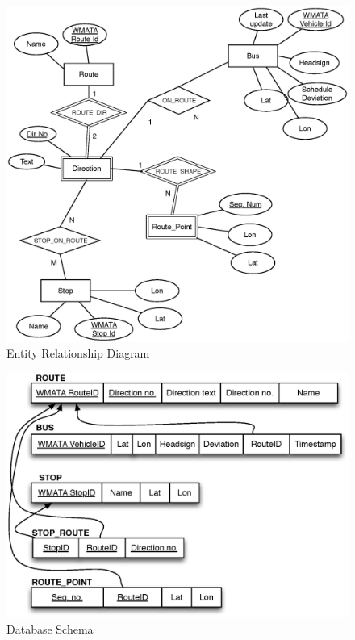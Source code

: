 \documentclass[12pt]{article}
\begin{document}
\begin{figure}[h]
  \caption{Entity Relationship Diagram}
  \centering
    \includegraphics[width=1.0\textwidth]{bus-entity-rel.eps}
\end{figure}


\begin{figure}[h]
  \caption{Database Schema}
  \centering
    \includegraphics[width=1.0\textwidth]{bus-schema.eps}
\end{figure}
\end{document}
